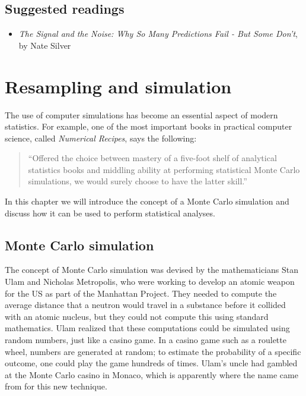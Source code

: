 \documentclass[12pt,]{book}
\providecommand{\tightlist}{%
  \setlength{\itemsep}{0pt}\setlength{\parskip}{0pt}}
\theoremstyle{definition}
\theoremstyle{definition}
\theoremstyle{definition}
\theoremstyle{remark}
\begin{document}
\hypertarget{suggested-readings-4}{%
\section{Suggested readings}\label{suggested-readings-4}}

\begin{itemize}
\tightlist
\item
  \emph{The Signal and the Noise: Why So Many Predictions Fail - But Some Don't}, by Nate Silver
\end{itemize}

\hypertarget{resampling-and-simulation}{%
\chapter{Resampling and simulation}\label{resampling-and-simulation}}

The use of computer simulations has become an essential aspect of modern statistics. For example, one of the most important books in practical computer science, called \emph{Numerical Recipes}, says the following:

\begin{quote}
``Offered the choice between mastery of a five-foot shelf of analytical statistics books and middling ability at performing statistical Monte Carlo simulations, we would surely choose to have the latter skill.''
\end{quote}

In this chapter we will introduce the concept of a Monte Carlo simulation and discuss how it can be used to perform statistical analyses.

\hypertarget{monte-carlo-simulation}{%
\section{Monte Carlo simulation}\label{monte-carlo-simulation}}

The concept of Monte Carlo simulation was devised by the mathematicians Stan Ulam and Nicholas Metropolis, who were working to develop an atomic weapon for the US as part of the Manhattan Project. They needed to compute the average distance that a neutron would travel in a substance before it collided with an atomic nucleus, but they could not compute this using standard mathematics.
Ulam realized that these computations could be simulated using random numbers, just like a casino game. In a casino game such as a roulette wheel, numbers are generated at random; to estimate the probability of a specific outcome, one could play the game hundreds of times. Ulam's uncle had gambled at the Monte Carlo casino in Monaco, which is apparently where the name came from for this new technique.
\end{document}
